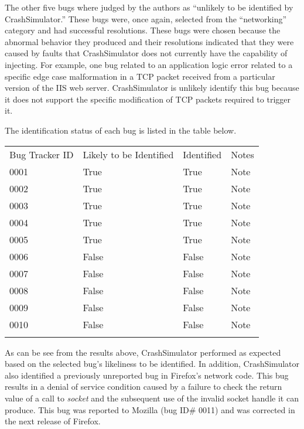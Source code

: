             The other five bugs where judged by the authors as ``unlikely to be identified by CrashSimulator.'' These
            bugs were, once again, selected from the ``networking'' category and had successful resolutions. These bugs
            were chosen because the abnormal behavior they produced and their resolutions indicated that they were
            caused by faults that CrashSimulator does not currently have the capability of injecting. For example, one
            bug related to an application logic error related to a specific edge case malformation in a TCP packet
            received from a particular version of the IIS web server. CrashSimulator is unlikely identify this bug
            because it does not support the specific modification of TCP packets required to trigger it.

            The identification status of each bug is listed in the table below.

            \begin{table}[H]
                \scriptsize{}
                \begin{tabular}{l  l  l  l}
                    \toprule{}
                        Bug Tracker ID & Likely to be Identified & Identified & Notes \\
                        0001 & True & True & Note \\
                        0002 & True & True & Note \\
                        0003 & True & True & Note \\
                        0004 & True & True & Note \\
                        0005 & True & True & Note \\
                        0006 & False & False & Note \\
                        0007 & False & False & Note \\
                        0008 & False & False & Note \\
                        0009 & False & False & Note \\
                        0010 & False & False & Note \\
                    \bottomrule{}
                \end{tabular}
            \end{table}

            As can be see from the results above, CrashSimulator performed as expected based on the selected bug's
            likeliness to be identified. In addition, CrashSimulator also identified a previously unreported bug in
            Firefox's network code. This bug results in a denial of service condition caused by a failure to check the
            return value of a call to \emph{socket} and the subsequent use of the invalid socket handle it can produce.
            This bug was reported to Mozilla (bug ID\# 0011) and was corrected in the next release of Firefox.

